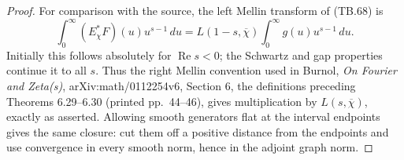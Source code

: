 \begin{proof}
For comparison with the source, the left Mellin transform
of (TB.68) is
\[
 \int_0^\infty(E_\chi^*F)(u)u^{s-1}\,du
       =L(1-s,\overline\chi)
                      \int_0^\infty g(u)u^{s-1}\,du.
 \tag{TB.73}
\]
Initially this follows absolutely for \(\operatorname{Re}s<0\);
the Schwartz and gap properties continue it to all \(s\).
Thus the right Mellin convention used in
Burnol, \emph{On Fourier and Zeta(s)}, arXiv:math/0112254v6,
Section 6, the definitions preceding Theorems 6.29--6.30
(printed pp.\ 44--46), gives multiplication by
\(L(s,\overline\chi)\), exactly as asserted.
Allowing smooth generators flat at the interval endpoints
gives the same closure: cut them off a positive distance
from the endpoints and use convergence in every smooth
norm, hence in the adjoint graph norm.
\end{proof}

